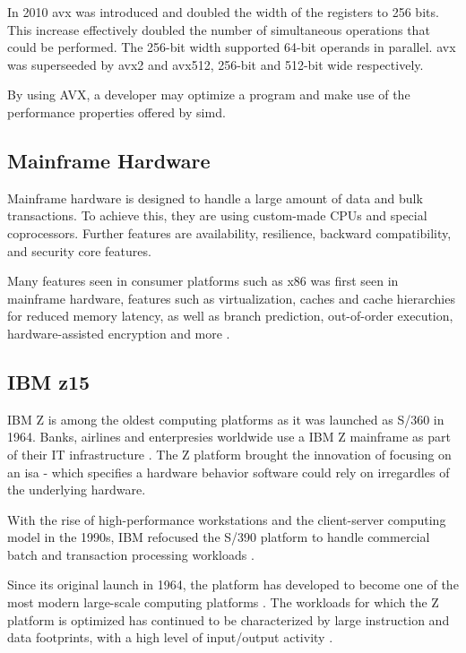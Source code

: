 In 2010 \gls{avx} was introduced and doubled the width of the registers to 256 bits. This increase effectively doubled the number of simultaneous operations that could be performed. The 256-bit width supported 64-bit operands in parallel\cite{hennessy2011:avx}. \gls{avx} was superseeded by \gls{avx2} and \gls{avx512}, 256-bit\cite{intel:avx2} and 512-bit\cite{intel:avx512} wide respectively.


By using AVX, a developer may optimize a program and make use of the performance properties offered by \gls{simd}\cite{hennessy2011:avx}.

\subsection{Mainframe Hardware}

Mainframe hardware is designed to handle a large amount of data and bulk transactions. To achieve this, they are using custom-made CPUs and special coprocessors. Further features are availability, resilience, backward compatibility, and security core features.

Many features seen in consumer platforms such as x86 was first seen in mainframe hardware, features such as virtualization, caches and cache hierarchies for reduced memory latency, as well as branch prediction, out-of-order execution, hardware-assisted encryption and more \cite{jacobi2020}.

\subsection{IBM z15}

IBM Z is among the oldest computing platforms as it was launched as S/360 in 1964. Banks, airlines and enterpresies worldwide use a IBM Z mainframe as part of their IT infrastructure \cite{jacobi2020}. The Z platform brought the innovation of focusing on an \acrfull{isa} - which specifies a hardware behavior software could rely on irregardles of the underlying hardware.

With the rise of high-performance workstations and the client-server computing model in the 1990s, IBM refocused the S/390 platform to handle commercial batch and transaction processing workloads \cite{jacobi2020}. 

Since its original launch in 1964, the platform has developed to become one of the most modern large-scale computing platforms \cite{jacobi2020}. The workloads for which the Z platform is optimized has continued to be characterized by large instruction and data footprints, with a high level of input/output activity \cite{jacobi2020}.

